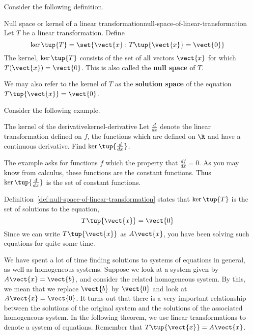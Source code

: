 Consider the following definition.

\begin{definition}{Null space or kernel of a linear transformation}{null-space-of-linear-transformation}
Let $T$ be a linear transformation. Define
\begin{equation*}
\ker \tup{T} = \set{\vect{x}:T \tup{\vect{x} }= \vect{0} } 
\end{equation*}
The kernel, $\ker \tup{T} $ consists of the set of all vectors $\vect{x}$ for which
$T (\vect{x}) = \vect{0}$. This is also called the
\textbf{null space} of $T$. 
\end{definition}

We may also refer to the kernel of $T$ as the
\textbf{solution space} of the equation $T \tup{\vect{x}} = \vect{0}$.


Consider the following example.

\begin{example}{The kernel of the derivative}{kernel-derivative}
Let $\frac{d}{dx}$ denote the linear transformation defined on $f$, the functions
which are defined on $\R$ and have a continuous derivative. Find 
$\ker \tup{\frac{d}{dx}}$.
\end{example}

\begin{solution} The example asks for functions $f$ which the property that $\frac{df}{dx}
=0. $ As you may know from calculus, these functions are the constant functions.
Thus $\ker \tup{\frac{d}{dx}}$ is the set of constant functions.
\end{solution} 

Definition~\ref{def:null-space-of-linear-transformation} states that $\ker \tup{T} $ is the set of
solutions to the equation,
\begin{equation*}
T\tup{\vect{x} } = \vect{0}
\end{equation*}
Since we can write $T\tup{\vect{x} }$ as $A\vect{x}$, you have been solving such
equations for quite some time.

We have spent a lot of time finding solutions to systems of equations in general, as well as
homogeneous systems. Suppose we look at a system given by $A\vect{x}=\vect{b}$, and consider the 
related homogeneous system. By this, we mean that we replace $\vect{b}$ by $\vect{0}$ and look at $A\vect{x}=\vect{0}$. 
It turns out that there is a very important relationship between the solutions of the original
system and the solutions of the associated homogeneous system. In the following 
theorem, we use linear transformations to denote a system of equations. Remember that
$T\tup{\vect{x}} = A\vect{x}$.

